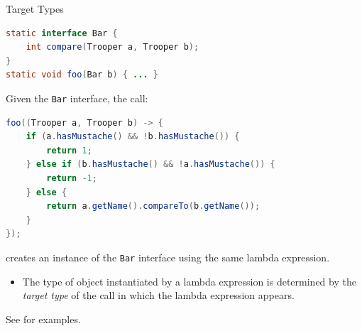 \documentclass{beamer}
\begin{document}
\begin{frame}[fragile]{Target Types}
\vspace{-.05in}
\begin{lstlisting}[language=Java]
static interface Bar {
    int compare(Trooper a, Trooper b);
}
static void foo(Bar b) { ... }
\end{lstlisting}
\vspace{-.05in}
Given the {\tt Bar} interface, the call:
\vspace{-.05in}
\begin{lstlisting}[language=Java]
foo((Trooper a, Trooper b) -> {
    if (a.hasMustache() && !b.hasMustache()) {
        return 1;
    } else if (b.hasMustache() && !a.hasMustache()) {
        return -1;
    } else {
        return a.getName().compareTo(b.getName());
    }
});
\end{lstlisting}
\vspace{-.05in}
creates an instance of the {\tt Bar} interface using the same lambda expression.
\vspace{-.05in}
\begin{itemize}
\item The type of object instantiated by a lambda expression is determined by the {\it target type} of the call in which the lambda expression appears.
\end{itemize}

See  for examples.

\end{frame}
\end{document}
